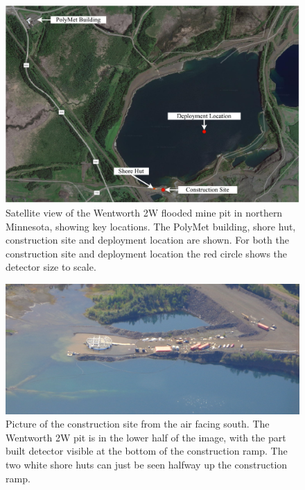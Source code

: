 \begin{figure} %
    \includegraphics[width=\textwidth]{diagrams/4-chips/pit.pdf}
    \caption[Satellite view of the Wentworth 2W mine pit, with key locations.]
    {Satellite view of the Wentworth 2W flooded mine pit in northern Minnesota, showing key
        \chipsfive locations. The PolyMet building, shore hut, construction site and deployment
        location are shown. For both the construction site and deployment location the red circle
        shows the \chipsfive detector size to scale.}
    \label{fig:pit}
\end{figure}

\begin{figure} %
    \includegraphics[width=\textwidth]{diagrams/4-chips/from_the_sky.jpg}
    \caption[Picture of the \chipsfive construction site from the air.]
    {Picture of the \chipsfive construction site from the air facing south. The Wentworth 2W pit
        is in the lower half of the image, with the part built \chipsfive detector visible at the
        bottom of the construction ramp. The two white shore huts can just be seen halfway up the
        construction ramp.}
    \label{fig:from_the_sky}
\end{figure}

